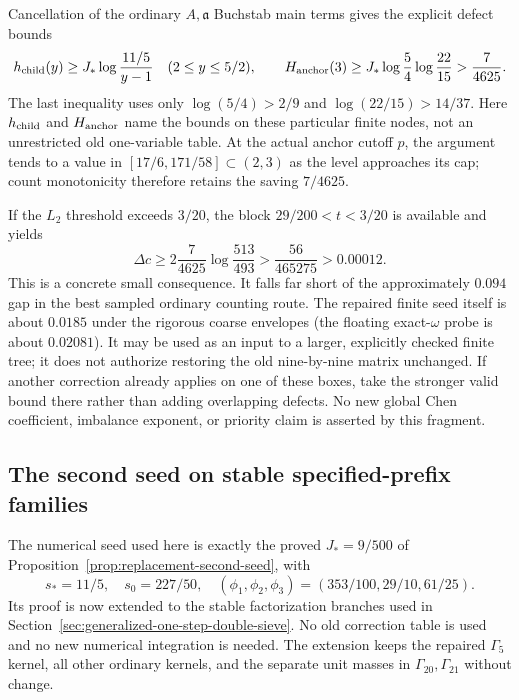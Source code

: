 \documentclass[11pt]{article}
\begin{document}
Cancellation of the ordinary $A,\mathfrak a$ Buchstab main terms gives
the explicit defect bounds
\begin{equation}\label{eq:replacement-second-seed-h3}
 h_{\rm child}(y)\ge J_*\log\frac{11/5}{y-1}
 \quad(2\le y\le5/2),\qquad
 H_{\rm anchor}(3)\ge
 J_*\log\frac54\log\frac{22}{15}
 >\frac7{4625}.
\end{equation}
The last inequality uses only
$\log(5/4)>2/9$ and $\log(22/15)>14/37$.
Here $h_{\rm child}$ and $H_{\rm anchor}$ name the bounds on these
particular finite nodes, not an unrestricted old one-variable table.
At the actual anchor cutoff $p$, the argument tends to a value in
$[17/6,171/58]\subset(2,3)$ as the level approaches its cap;
count monotonicity therefore retains
the saving $7/4625$.

If the $L_2$ threshold exceeds $3/20$, the block
$29/200<t<3/20$ is available and yields
\begin{equation}\label{eq:replacement-second-seed-l2-gain}
 \Delta c\ge2\frac7{4625}\log\frac{513}{493}
 >\frac{56}{465275}>0.00012.
\end{equation}
This is a concrete small consequence.  It falls far short of the
approximately $0.094$ gap in the best sampled ordinary counting route.
The repaired finite seed itself is about $0.0185$ under the rigorous
coarse envelopes (the floating exact-$\omega$ probe is about $0.02081$).
It may be used as an input to a larger, explicitly checked finite tree;
it does not authorize restoring the old nine-by-nine matrix unchanged.
If another correction already applies on one of these boxes, take the
stronger valid bound there rather than adding overlapping defects.
No new global Chen coefficient, imbalance exponent, or priority claim
is asserted by this fragment.

\subsection{The second seed on stable specified-prefix families}
\label{sec:second-seed-stable-prefix}

The numerical seed used here is exactly the proved $J_*=9/500$ of
Proposition~\ref{prop:replacement-second-seed}, with
\[
 s_*=11/5,\quad s_0=227/50,\quad
 (\phi_1,\phi_2,\phi_3)=(353/100,29/10,61/25).
\]
Its proof is now extended to the stable factorization branches used
in Section~\ref{sec:generalized-one-step-double-sieve}.  No old
correction table is used and no new numerical integration is needed.
The extension keeps the repaired $\Gamma_5$ kernel, all other
ordinary kernels, and the separate unit masses in $\Gamma_{20},
\Gamma_{21}$ without change.
\end{document}
